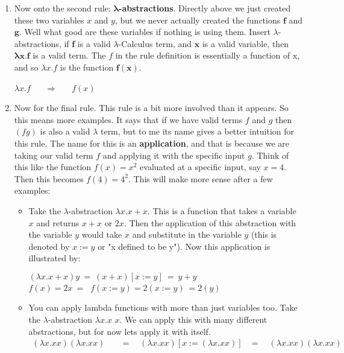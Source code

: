 \documentclass[12pt]{article}
\begin{document}
\begin{enumerate}
\item Now onto the second rule: $\boldsymbol{\lambda}$\textbf{-abstractions}. Directly above we just created these two variables $x$ and $y$, but we never actually created the functions $\mathbf{f}$ and $\mathbf{g}$. Well what good are these variables if nothing is using them. Insert $\lambda$-abstractions, if \textbf{f} is a valid $\lambda$-Calculus term, and $\mathbf{x}$ is a valid variable, then $\boldsymbol{\lambda}\mathbf{x. f}$ is a valid term. The $f$ in the rule definition is essentially a function of x, and so $\lambda x.f$ is the function $\mathbf{f(x)}$. 
\begin{center}
$\lambda x.f$ $\quad$ $\Rightarrow$ $\quad$ $f(x)$ 
\end{center}

\item Now for the final rule. This rule is a bit more involved than it appears. So this means more examples. It says that if we have valid terms $f$ and $g$ then $(fg)$ is also a valid $\lambda$ term, but to me its name gives a better intuition for this rule. The name for this is an \textbf{application}, and that is because we are taking our valid term $f$ and applying it with the specific input $g$. Think of this like the function $f(x) = x^2$ evaluated at a specific input, say $x=4$. Then this becomes $f(4) = 4^2$. This will make more sense after a few examples:
\begin{itemize}
\item Take the $\lambda$-abstraction $\lambda x.x + x$. This is a function that takes a variable $x$ and returns $x+x$ or $2x$. Then the application of this abstraction with the variable $y$ would take $x$ and substitute in the variable $y$ (this is denoted by $x:=y$ or "x defined to be y"). Now this application is illustrated by: 
\begin{center}
$(\lambda x.x + x)y \ = \ (x + x)[x:=y] \ = \ y + y$
\vspace{3mm}
\\$f(x) = 2x \ = \ $  $f(x:=y) = 2(x:=y) \ = 2(y)$
\end{center}
\item You can apply lambda functions with more than just variables too. Take the $\lambda$-abstraction $\lambda x.x$ $x$. We can apply this with many different abstractions, but for now lets apply it with itself. 
\begin{align*}
(\lambda x.x x) (\lambda x.x x)\quad &= \quad (\lambda x.x x) [x := (\lambda x.x x)]
&= \quad (\lambda x.x x) (\lambda x.x x)
\end{align*}

\end{itemize}
\end{enumerate}
\end{document}
